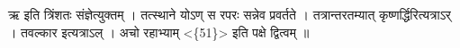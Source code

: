 ऋ इति त्रिंशतः संज्ञेत्युक्तम् । तत्स्थाने योऽण् स रपरः सन्नेव प्रवर्तते
। तत्रान्तरतम्यात् कृष्णर्द्धिरित्यत्राऽर् । तवल्कार इत्यत्राऽल् । अचो
रहाभ्याम् \textless{}\{51\}\textgreater{} इति पक्षे द्वित्वम् ॥
